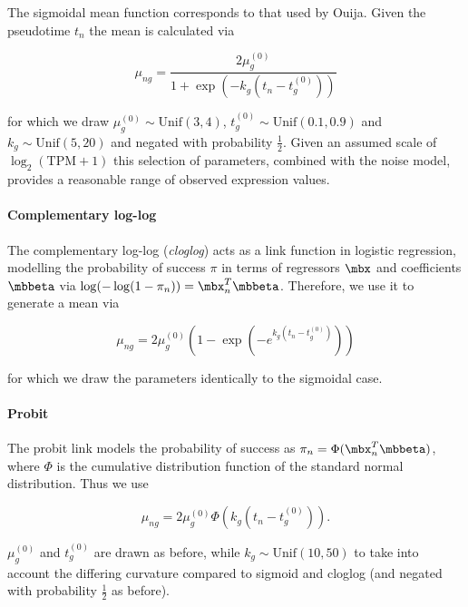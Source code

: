 The sigmoidal mean function corresponds to that used by Ouija. Given the pseudotime $t_n$ the mean is calculated via

\begin{equation}
    \mu_{ng} = \frac{2 \mu^{(0)}_g}{1 + \exp(-k_g (t_n - t^{(0)}_g))}
\end{equation}

for which we draw $\mu^{(0)}_g \sim \text{Unif}(3,4)$, $t^{(0)}_g \sim \text{Unif}(0.1, 0.9)$ and $k_g \sim \text{Unif}(5, 20)$ and negated with probability $\frac{1}{2}$. Given an assumed scale of $\log_2{(\text{TPM}+1)}$ this selection of parameters, combined with the noise model, provides a reasonable range of observed expression values.

\paragraph{Complementary log-log}

The complementary log-log (\emph{cloglog}) acts as a link function in logistic regression, modelling the probability of success $\pi$ in terms of regressors $\mbx$ and coefficients $\mbbeta$ via $\log(-\log(1 - \pi_n)) = \mbx_n^T \mbbeta$. Therefore, we use it to generate a mean via

\begin{equation}
    \mu_{ng} = 2 \mu^{(0)}_g \left(1 - \exp(-e^{k_g (t_n - t^{(0)}_{g})}) \right)
\end{equation}

for which we draw the parameters identically to the sigmoidal case.

\paragraph{Probit}

The probit link models the probability of success as $\pi_n = \Phi(\mbx_n^T \mbbeta)$, where $\Phi$ is the cumulative distribution function of the standard normal distribution. Thus we use

\begin{equation}
    \mu_{ng} = 2 \mu_g^{(0)} \Phi\left(k_g (t_n - t^{(0)}_{g})\right).
\end{equation}

$ \mu_g^{(0)}$ and $t^{(0)}_{g}$ are drawn as before, while $k_g \sim \text{Unif}(10, 50)$ to take into account the differing curvature compared to sigmoid and cloglog (and negated with probability $\frac{1}{2}$ as before). 


